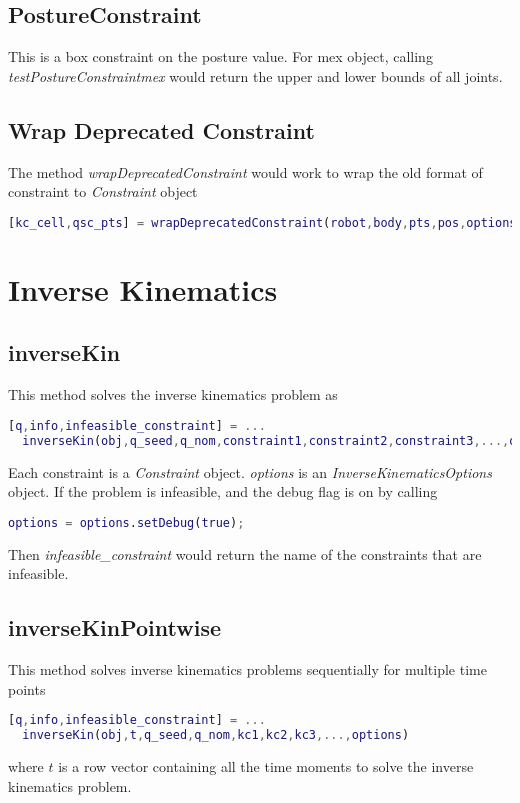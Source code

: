 \documentclass{article}
\begin{document}
\subsection{PostureConstraint}
This is a box constraint on the posture value. For mex object, calling \textsl{testPostureConstraintmex} would return the upper and lower bounds of all joints.
\subsection{Wrap Deprecated Constraint}
The method \textsl{wrapDeprecatedConstraint} would work to wrap the old format of constraint to \textsl{Constraint} object
\begin{lstlisting}[language=MATLAB]
[kc_cell,qsc_pts] = wrapDeprecatedConstraint(robot,body,pts,pos,options)
\end{lstlisting}
\section{Inverse Kinematics}
\subsection{inverseKin}
This method solves the inverse kinematics problem as
\begin{lstlisting}[language=MATLAB]
[q,info,infeasible_constraint] = ...
  inverseKin(obj,q_seed,q_nom,constraint1,constraint2,constraint3,...,options)
\end{lstlisting}
Each constraint is a \textsl{Constraint} object. \textsl{options} is an \textsl{InverseKinematicsOptions} object. If the problem is infeasible, and the debug flag is on by calling
\begin{lstlisting}[language=MATLAB]
options = options.setDebug(true);
\end{lstlisting}
Then \textsl{infeasible\_constraint} would return the name of the constraints that are infeasible.
\subsection{inverseKinPointwise}
This method solves inverse kinematics problems sequentially for multiple time points
\begin{lstlisting}[language=MATLAB]
 [q,info,infeasible_constraint] = ...
  inverseKin(obj,t,q_seed,q_nom,kc1,kc2,kc3,...,options)
\end{lstlisting}
where $t$ is a row vector containing all the time moments to solve the inverse kinematics problem.
\end{document}
